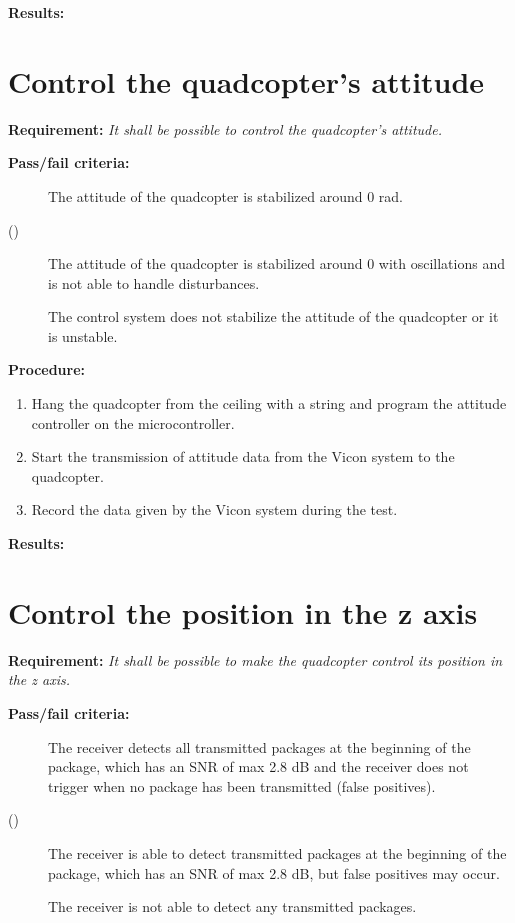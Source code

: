 \textbf{Results:}

\newpage

\section{Control the quadcopter's attitude}
\textbf{Requirement:}
\textit{It shall be possible to control the quadcopter's attitude.}

\textbf{Pass/fail criteria:}
	\begin{description}
	\item[] The attitude of the quadcopter is stabilized around 0 rad.
	\item[()] The attitude of the quadcopter is stabilized around 0 with oscillations and is not able to handle disturbances.
	\item[ \phantom{)}] The control system does not stabilize the attitude of the quadcopter or it is unstable.
	\end{description}
\textbf{Procedure:}\\
\begin{enumerate}
	\item Hang the quadcopter from the ceiling with a string and program the attitude controller on the microcontroller.
	\item Start the transmission of attitude data from the Vicon system to the quadcopter.
	\item Record the data given by the Vicon system during the test.
\end{enumerate} 
\textbf{Results:}


\newpage

\section{Control the position in the z axis}
\textbf{Requirement:}
\textit{It shall be possible to make the quadcopter control its position in the z axis.}

\textbf{Pass/fail criteria:}
	\begin{description}
	\item[  ] The receiver detects all transmitted packages at the beginning of the package, which has an SNR of max 2.8 dB and the receiver does not trigger when no package has been transmitted (false positives).
	\item[()]The receiver is able to detect transmitted packages at the beginning of the package, which has an SNR of max 2.8 dB, but false positives may occur.
	\item[  \phantom{)}]The receiver is not able to detect any transmitted packages.
	\end{description}


